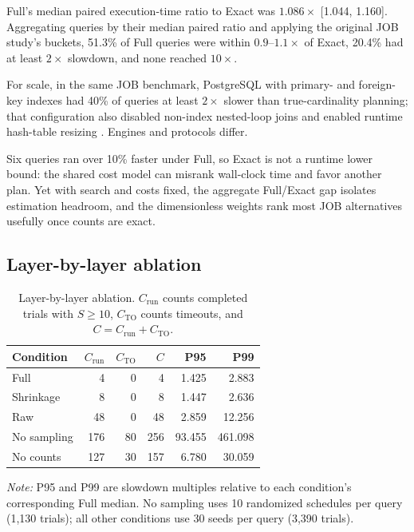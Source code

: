 \documentclass[sigconf]{cidr-2027}
\begin{document}
Full's median paired execution-time ratio to Exact was $1.086\times$ [1.044,
1.160]. Aggregating queries by their median paired ratio and applying the
original JOB study's buckets, 51.3\% of Full queries were within
$0.9$--$1.1\times$ of Exact, 20.4\% had at least $2\times$ slowdown, and none
reached $10\times$.

For scale, in the same JOB benchmark, PostgreSQL with primary- and
foreign-key indexes had 40\% of queries at least $2\times$ slower than
true-cardinality planning; that configuration also disabled non-index
nested-loop joins and enabled runtime hash-table resizing
\cite{leis2015optimizers}. Engines and protocols differ.

Six queries ran over 10\% faster under Full, so Exact is not a runtime lower
bound: the shared cost model can misrank wall-clock time and favor another
plan. Yet with search and costs fixed, the aggregate Full/Exact gap isolates
estimation headroom, and the dimensionless weights rank most JOB alternatives
usefully once counts are exact.

\subsection{Layer-by-layer ablation}

\begin{table}[t]
  \caption{Layer-by-layer ablation. $C_{\mathrm{run}}$ counts completed trials
  with $S\geq 10$, $C_{\mathrm{TO}}$ counts timeouts, and
  $C=C_{\mathrm{run}}+C_{\mathrm{TO}}$.}
  \label{tab:ablation}
  \centering
  \small
  \setlength{\tabcolsep}{4pt}
  \begin{tabular}{@{}lrrrrr@{}}
    \toprule
    Condition & $C_{\mathrm{run}}$ & $C_{\mathrm{TO}}$ & $C$ & P95 & P99 \\
    \midrule
    Full             & 4   & 0  & 4   & 1.425 & 2.883 \\
    Shrinkage        & 8   & 0  & 8   & 1.447 & 2.636 \\
    Raw              & 48  & 0  & 48  & 2.859 & 12.256 \\
    No sampling      & 176 & 80 & 256 & 93.455 & 461.098 \\
    No counts        & 127 & 30 & 157 & 6.780 & 30.059 \\
    \bottomrule
  \end{tabular}
  \begin{minipage}{\columnwidth}
    \footnotesize\emph{Note:} P95 and P99 are slowdown multiples relative to
    each condition's corresponding Full median. No sampling uses 10 randomized
    schedules per query (1,130 trials); all other conditions use 30 seeds per
    query (3,390 trials).
  \end{minipage}
\end{table}
\end{document}

